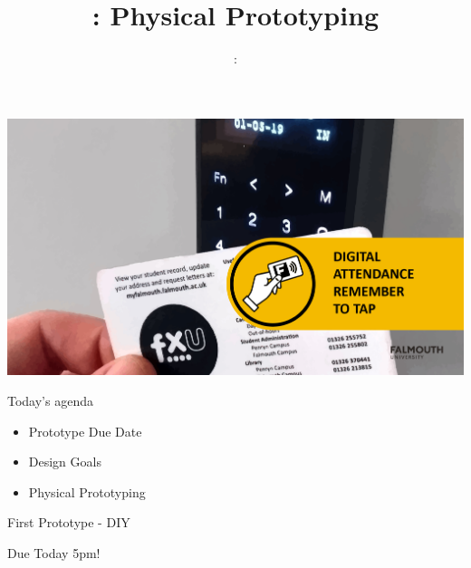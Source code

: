 \usepackage{../../beamerthemeFalmouthGamesAcademy}
\usepackage{multimedia}
\graphicspath{ {../../} }


\usepackage[normalem]{ulem}
\usepackage{wasysym}
\usepackage{graphicx} %

\usepackage{pdfpages}

\usetikzlibrary{arrows,automata}





\title{\sessionnumber: Physical Prototyping}
\subtitle{\modulecode: \moduletitle}

\begin{frame}
	\includegraphics[width=1.0\textwidth]{sign-in}
\end{frame}

\frame{\titlepage} 


\begin{frame}{Today's agenda}
	\begin{itemize}
		\item Prototype Due Date
		\item Design Goals
		\item Physical Prototyping
	\end{itemize}
\end{frame}

\begin{frame}{First Prototype - DIY}
\begin{center}
	\Huge{Due Today 5pm!}
\end{center}
\end{frame}


